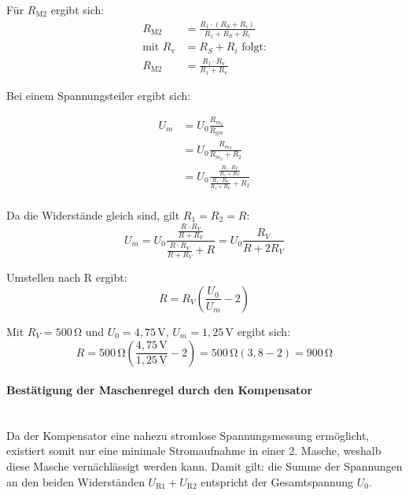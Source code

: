 \documentclass[12pt,a4paper,titlepage]{scrartcl}
\numberwithin{equation}{section}
\numberwithin{table}{section}
\numberwithin{figure}{section}
\begin{document}
\medspace
Für $R_\text{M2}$ ergibt sich:
\begin{equation}
    \begin{aligned}
        R_\text{M2} &= \frac{R_1 \cdot (R_S + R_i)}{R_1 + R_S + R_i} \\[1ex]
        \text{mit } R_\text{v} &= R_S + R_i \text{ folgt:} \\[1ex]
        R_\text{M2} &= \frac{R_1 \cdot R_\text{v}}{R_1 + R_\text{v}}
    \end{aligned}
\end{equation}

Bei einem Spannungsteiler ergibt sich:

\begin{equation}
    \begin{aligned}
        U_m &= U_0 \frac{R_{m_2}}{R_\text{ges}} \\[1ex]
        &= U_0 \frac{R_{m_2}}{R_{m_2} + R_2} \\[1ex]
        &= U_0 \frac{\frac{R_1 \cdot R_V}{R_1 + R_V}}{\frac{R_1 \cdot R_V}{R_1 + R_V} + R_2} \\[1ex]
    \end{aligned}
\end{equation}

Da die Widerstände gleich sind, gilt $R_1 = R_2 = R$:
\begin{equation}
    U_m = U_0 \frac{\frac{R \cdot R_V}{R + R_V}}{\frac{R \cdot R_V}{R + R_V} + R} = U_0 \frac{R_V}{R + 2R_V}    
\end{equation}

Umstellen nach R ergibt:
\begin{equation}
    R = R_V \left( \frac{U_0}{U_m} - 2 \right)
\end{equation}

Mit $R_V = 500\,\si{\ohm}$ und $U_0 = 4{,}75\,\text{V}$, $U_m = 1{,}25\,\text{V}$ ergibt sich:
\begin{equation}
    R = 500\,\si{\ohm} \left( \frac{4{,}75\,\text{V}}{1{,}25\,\text{V}} - 2 \right) = 500\,\si{\ohm} \left( 3{,}8 - 2 \right) = 900\,\si{\ohm}
\end{equation}

\paragraph{Bestätigung der Maschenregel durch den Kompensator}\mbox{}\\
Da der Kompensator eine nahezu stromlose Spannungsmessung ermöglicht, 
existiert somit nur eine minimale Stromaufnahme in einer 2. Masche, weshalb diese Masche vernächlässigt werden kann.
Damit gilt: die Summe der Spannungen an den beiden Widerständen $U_\text{R1} + U_\text{R2}$ entspricht der Gesamtspannung $U_0$.
\end{document}
